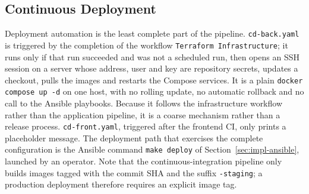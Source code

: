 \subsection{Continuous Deployment}
\label{sec:impl-cd}

Deployment automation is the least complete part of the pipeline. \texttt{cd-back.yaml} is triggered by the completion of the workflow \texttt{Terraform Infrastructure}; it runs only if that run succeeded and was not a scheduled run, then opens an SSH session on a server whose address, user and key are repository secrets, updates a checkout, pulls the images and restarts the Compose services. It is a plain \texttt{docker compose up -d} on one host, with no rolling update, no automatic rollback and no call to the Ansible playbooks. Because it follows the infrastructure workflow rather than the application pipeline, it is a coarse mechanism rather than a release process. \texttt{cd-front.yaml}, triggered after the frontend CI, only prints a placeholder message. The deployment path that exercises the complete configuration is the Ansible command \texttt{make deploy} of Section~\ref{sec:impl-ansible}, launched by an operator. Note that the continuous-integration pipeline only builds images tagged with the commit SHA and the suffix \texttt{-staging}; a production deployment therefore requires an explicit image tag.


